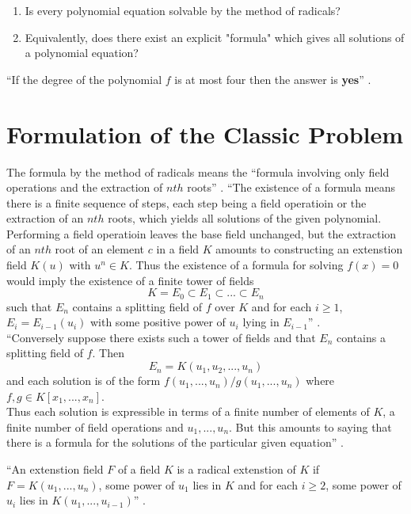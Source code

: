 \begin{enumerate}
\item Is every polynomial equation solvable by the method of radicals?
\item Equivalently, does there exist an explicit "formula" which gives all solutions of a polynomial equation?
\end{enumerate}

``If the degree of  the polynomial \(f\) is at most four then the answer is \textbf{yes}'' \cite{hunger}.

\section{Formulation of the Classic Problem}
The formula by the method of radicals means the ``formula involving only field operations and the extraction of \(nth\) roots'' \cite{hunger}.
``The existence of a formula means there is a finite sequence of steps, each step being a field operatioin or the extraction of an \(nth\) roots, which yields all solutions of the given polynomial.
Performing a field operatioin leaves the base field unchanged, but the extraction of an \(nth\) root of an element
\(c\) in a field \(K\) amounts to constructing an extenstion field \(K(u)\) with \(u^n \in K\). Thus the existence of a formula for solving \(f(x)=0\) would imply
the existence of a finite tower of fields
\[K=E_0 \subset E_1 \subset ... \subset E_n\]
such that \(E_n\) contains a splitting field of \(f\) over \(K\) and for each \(i \geq 1\), \(E_i=E_{i-1}(u_i)\) with some positive power of \(u_i\) lying in \(E_{i-1}\)'' \cite{hunger}.\\
``Conversely suppose there exists such a tower of fields and that \(E_n\) contains a splitting field of \(f\). Then
\[E_n = K(u_1,u_2,...,u_n)\]
and each solution is of the form \(f(u_1,...,u_n)/g(u_1,...,u_n)\) where \(f,g \in K[x_1,...,x_n]\). \\
Thus each solution is expressible in terms of a finite number of elements of \(K\), a finite number of field operations and \(u_1,...,u_n\). But
this amounts to saying that there is a formula for the solutions of the particular given equation'' \cite{hunger}. \\

\begin{definition}
``An extenstion field \(F\) of a field \(K\) is a radical extenstion of \(K\) if \(F=K(u_1,...,u_n)\), some power of \(u_1\) lies in \(K\) and for each \(i \geq 2\), some power of \(u_i\) lies in \(K(u_1,...,u_{i-1})\)'' \cite{hunger}.
\end{definition}

